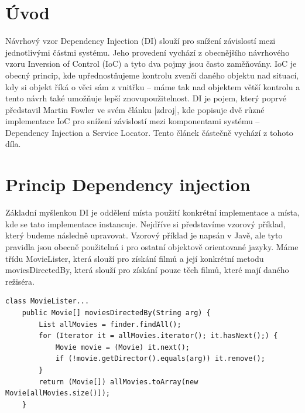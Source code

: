 \documentclass[a4paper,conference]{IEEEtran}
\begin{document}
\section{Úvod}
Návrhový vzor Dependency Injection (DI) slouží pro snížení závislostí mezi jednotlivými částmi systému. Jeho provedení vychází z obecnějšího návrhového vzoru Inversion of Control (IoC) a tyto dva pojmy jsou často zaměňovány.
IoC je obecný princip, kde upřednostňujeme kontrolu zvenčí daného objektu nad situací, kdy si objekt říká o věci sám z vnitřku – máme tak nad objektem větší kontrolu a tento návrh také umožňuje lepší znovupoužitelnost.
DI je pojem, který poprvé představil Martin Fowler ve svém článku [zdroj], kde popisuje dvě různé implementace IoC pro snížení závislostí mezi komponentami systému – Dependency Injection a Service Locator. Tento článek částečně vychází z tohoto díla.

\section{Princip Dependency injection}
Základní myšlenkou DI je oddělení místa použití konkrétní implementace a místa, kde se tato implementace instancuje. Nejdříve si představíme vzorový příklad, který budeme následně upravovat. Vzorový příklad je napsán v Javě, ale tyto pravidla jsou obecně použitelná i pro ostatní objektově orientované jazyky.
Máme třídu MovieLister, která slouží pro získání filmů a její konkrétní metodu moviesDirectedBy, která slouží pro získání pouze těch filmů, které mají daného režiséra.

\begin{lstlisting}
class MovieLister...
    public Movie[] moviesDirectedBy(String arg) {
        List allMovies = finder.findAll();
        for (Iterator it = allMovies.iterator(); it.hasNext();) {
            Movie movie = (Movie) it.next();
            if (!movie.getDirector().equals(arg)) it.remove();
        }
        return (Movie[]) allMovies.toArray(new Movie[allMovies.size()]);
    }
\end{lstlisting}
\end{document}
